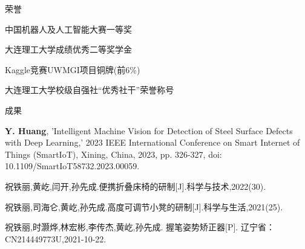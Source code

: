 \documentclass{resume} %
\begin{document}
\vspace{-1em}

\begin{rSection}{\fangsong 荣誉}

\begin{rSubsection}{}{}
{}{}
  \item {\fangsong 中国机器人及人工智能大赛一等奖}\\
  \item {\fangsong 大连理工大学成绩优秀二等奖学金}\\
  \item {\fangsong Kaggle竞赛UWMGI项目铜牌(前6\%)}\\
  \item {\fangsong 大连理工大学校级自强社“优秀社干”荣誉称号}\\
\end{rSubsection}
\end{rSection}

\begin{rSection}{\fangsong 成果}
\begin{rSubsection}{}{}
{}{}
	\item {{\bf Y. Huang}, 'Intelligent Machine Vision for Detection of Steel Surface Defects with Deep Learning,' 2023 IEEE International Conference on Smart Internet of Things (SmartIoT), Xining, China, 2023, pp. 326-327, doi: 10.1109/SmartIoT58732.2023.00059.}\\
  \item {\fangsong 祝铁丽,黄屹,闫开,孙先成.便携折叠床椅的研制[J].科学与技术,2022(30).}\\
  \item {\fangsong 祝铁丽,司海仑,黄屹,孙先成.高度可调节小凳的研制[J].科学与生活,2021(25).}\\
  \item {\fangsong 祝铁丽,时灏烨,林宏彬,李传杰,黄屹,孙先成. 握笔姿势矫正器[P]. 辽宁省：CN214449773U,2021-10-22.}\\
\end{rSubsection}
\end{rSection}

\end{document}
